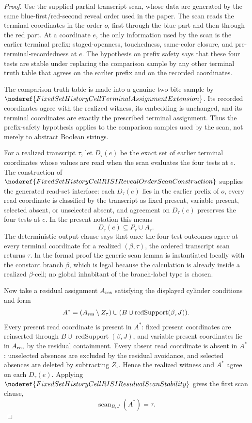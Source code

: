 \begin{proof}
Use the supplied partial transcript scan, whose data are generated by the same
blue-first/red-second reveal order used in the paper.  The scan reads the
terminal coordinates in the order \(o\),
first through the blue part and then through the red part.  At a coordinate
\(e\), the only information used by the scan is the earlier terminal
prefix: staged-openness, touchedness, same-color closure, and
pre-terminal-recordedness at \(e\).  The hypothesis on prefix safety says
that these four tests are stable under replacing the comparison sample by
any other terminal truth table that agrees on the earlier prefix and on the
recorded coordinates.

The comparison truth table is made into a genuine two-bite sample by
\(\noderef{FixedSetHistoryCellTerminalAssignmentExtension}\).  Its recorded
coordinates agree with the realized witness, its embedding is unchanged,
and its terminal coordinates are exactly the prescribed terminal assignment.
Thus the prefix-safety hypothesis applies to the comparison samples used by
the scan, not merely to abstract Boolean strings.

For a realized transcript \(\tau\), let \(D_\tau(e)\) be the exact set of
earlier terminal coordinates whose values are read when the scan evaluates
the four tests at \(e\).  The construction of
\(\noderef{FixedSetHistoryCellRISIRevealOrderScanConstruction}\) supplies
the generated read-set interface: each \(D_\tau(e)\) lies in the earlier
prefix of \(o\), every read coordinate is classified by the transcript as
fixed present, variable present, selected absent, or unselected absent, and
agreement on \(D_\tau(e)\) preserves the four tests at \(e\).  In the
present notation this means
\[
D_\tau(e)\subseteq P_\tau\cup A_\tau .
\]
The deterministic-output clause says that once the four test outcomes agree
at every terminal coordinate for a realized \((\beta,\tau)\), the ordered
transcript scan returns \(\tau\).  In the formal proof the generic scan lemma
is instantiated locally with the constant branch \(\beta\), which is legal
because the calculation is already inside a realized \(\beta\)-cell; no
global inhabitant of the branch-label type is chosen.

Now take a residual assignment \(A_{\rm res}\) satisfying the displayed
cylinder conditions and form
\[
A^\ast=(A_{\rm res}\setminus Z_\tau)\cup
  (B\cup\operatorname{redSupport}(\beta,J)).
\]
Every present read coordinate is present in \(A^\ast\): fixed present
coordinates are reinserted through
\(B\cup\operatorname{redSupport}(\beta,J)\), and variable present
coordinates lie in \(A_{\rm res}\) by the residual containment.  Every
absent read coordinate is absent in \(A^\ast\): unselected absences are
excluded by the residual avoidance, and selected absences are deleted by
subtracting \(Z_\tau\).  Hence the realized witness and \(A^\ast\) agree on
each \(D_\tau(e)\).  Applying
\(\noderef{FixedSetHistoryCellRISIResidualScanStability}\) gives the first
scan clause,
\[
\operatorname{scan}_{B,J}(A^\ast)=\tau .
\]


\end{proof}
